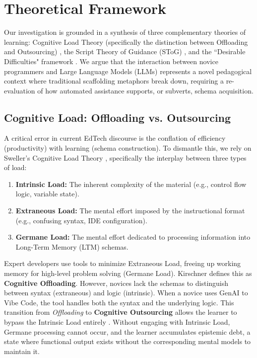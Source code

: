 \documentclass[sigconf]{acmart}
\begin{document}
\section{Theoretical Framework}

Our investigation is grounded in a synthesis of three complementary theories of learning: Cognitive Load Theory (specifically the distinction between Offloading and Outsourcing) \cite{sweller1988}, the Script Theory of Guidance (SToG) \cite{fischer2013}, and the ``Desirable Difficulties" framework \cite{bjork1994}. We argue that the interaction between novice programmers and Large Language Models (LLMs) represents a novel pedagogical context where traditional scaffolding metaphors break down, requiring a re-evaluation of how automated assistance supports, or subverts, schema acquisition.

\subsection{Cognitive Load: Offloading vs. Outsourcing}
A critical error in current EdTech discourse is the conflation of efficiency (productivity) with learning (schema construction). To dismantle this, we rely on Sweller's Cognitive Load Theory \cite{sweller1988}, specifically the interplay between three types of load:
\begin{enumerate}
    \item \textbf{Intrinsic Load:} The inherent complexity of the material (e.g., control flow logic, variable state).
    \item \textbf{Extraneous Load:} The mental effort imposed by the instructional format (e.g., confusing syntax, IDE configuration).
    \item \textbf{Germane Load:} The mental effort dedicated to processing information into Long-Term Memory (LTM) schemas.
\end{enumerate}

Expert developers use tools to minimize Extraneous Load, freeing up working memory for high-level problem solving (Germane Load). Kirschner \cite{kirschner2026} defines this as \textbf{Cognitive Offloading}. However, novices lack the schemas to distinguish between syntax (extraneous) and logic (intrinsic). When a novice uses GenAI to Vibe Code, the tool handles both the syntax and the underlying logic. This transition from \textit{Offloading} to \textbf{Cognitive Outsourcing} allows the learner to bypass the Intrinsic Load entirely \cite{kirschner2026}. Without engaging with Intrinsic Load, Germane processing cannot occur, and the learner accumulates epistemic debt, a state where functional output exists without the corresponding mental models to maintain it.
\end{document}
